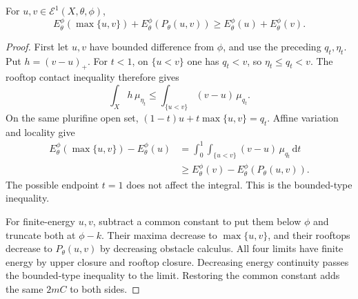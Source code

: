 \begin{theorem}\label{thm:relative-energy-diamond}
For $u,v\in\mathcal E^1(X,\theta,\phi)$,
\begin{equation}\label{eq:relative-energy-diamond}
 E_\theta^\phi(\max\{u,v\})+E_\theta^\phi(P_\theta(u,v))
                      \geq E_\theta^\phi(u)+E_\theta^\phi(v).
\end{equation}
\end{theorem}
\begin{proof}
First let $u,v$ have bounded difference from $\phi$, and use the preceding $q_t,\eta_t$. Put $h=(v-u)_+$. For $t<1$, on $\{u<v\}$ one has $q_t<v$, so $\eta_t\leq q_t<v$. The rooftop contact inequality therefore gives
\[
 \int_Xh\,\mu_{\eta_t}
                   \leq\int_{\{u<v\}}(v-u)\,\mu_{q_t}.
\]
On the same plurifine open set, $(1-t)u+t\max\{u,v\}=q_t$. Affine variation and locality give
\[
 \begin{aligned}
 E_\theta^\phi(\max\{u,v\})-E_\theta^\phi(u)
  &=\int_0^1\int_{\{u<v\}}(v-u)\,\mu_{q_t}\,\mathrm dt\\
  &\geq E_\theta^\phi(v)-E_\theta^\phi(P_\theta(u,v)).
 \end{aligned}
\]
The possible endpoint $t=1$ does not affect the integral. This is the bounded-type inequality.

For finite-energy $u,v$, subtract a common constant to put them below $\phi$ and truncate both at $\phi-k$. Their maxima decrease to $\max\{u,v\}$, and their rooftops decrease to $P_\theta(u,v)$ by decreasing obstacle calculus. All four limits have finite energy by upper closure and rooftop closure. Decreasing energy continuity passes the bounded-type inequality to the limit. Restoring the common constant adds the same $2mC$ to both sides.
\end{proof}

